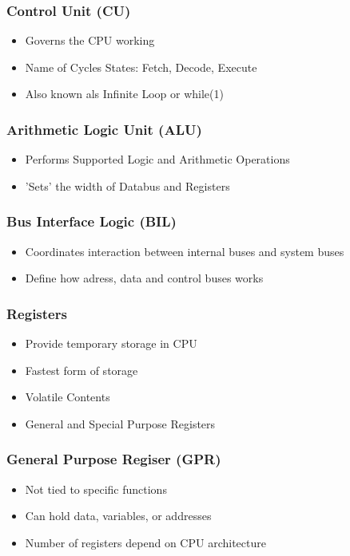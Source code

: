 \begin{multicols}{2}
	\subsubsection{Control Unit (\acs{CU})}   
		\begin{itemize}
			\item Governs the CPU working
			\item Name of Cycles States: Fetch, Decode, Execute
			\item Also known als Infinite Loop or while(1)
		\end{itemize}	
	\subsubsection{Arithmetic Logic Unit (\acs{ALU})}
	\begin{itemize}
		\item Performs Supported Logic and Arithmetic Operations
		\item 'Sets' the width of Databus and Registers
	\end{itemize}	
	\subsubsection{Bus Interface Logic (\acs{BIL})}
	\begin{itemize}
		\item Coordinates interaction between internal buses and system buses
		\item Define how adress, data and control buses works
	\end{itemize}	
	\subsubsection{Registers}
	\begin{itemize}
		\item Provide temporary storage in \acs{CPU}
		\item Fastest form of storage
		\item Volatile Contents
		\item General and Special Purpose Registers
	\end{itemize}
	\subsubsection{General Purpose Regiser (\acs{GPR})}
	\begin{itemize}
		\item Not tied to specific functions
		\item Can hold data, variables, or addresses
		\item Number of registers depend on CPU architecture			
	\end{itemize}
	\columnbreak

\end{multicols}
